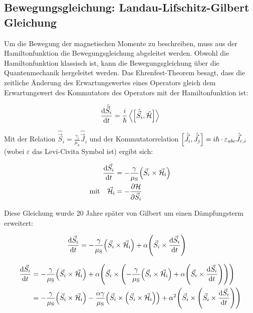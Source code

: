 \documentclass[main.tex]{subfiles}
\begin{document}
\subsection{Bewegungsgleichung: Landau-Lifschitz-Gilbert Gleichung}
Um die Bewegung der magnetischen Momente zu beschreiben, muss aus der
Hamiltonfunktion die Bewegungsgleichung abgeleitet werden.
Obwohl die Hamiltonfunktion klassisch ist, kann die Bewegungsgleichung über die
Quantenmechanik hergeleitet werden. Das Ehrenfest-Theorem besagt, dass die
zeitliche Änderung des Erwartungswertes eines Operators gleich dem
Erwartungswert des Kommutators des Operators mit der Hamiltonfunktion ist:

\begin{align}
	\dv{\hat{\vec{S}}_i}{t} = \frac{i}{\hbar} \expval{\qty[\hat{\vec{S}}_i,
			\hat{\mathcal{H}}]}
\end{align}%

Mit der Relation \(\hat{\vec{S}}_i = \frac{\gamma_i}{\mu_{\text{S}}}
\hat{\vec{J}}_i\) und der Kommutatorrelation \(\qty[\hat{\vec{J}}_i,
	\hat{\vec{J}}_j] = i \hbar \cdot \varepsilon_{abc}
\hat{\vec{J}}_{c,i}\) (wobei
\(\varepsilon\) das Levi-Civita Symbol ist) ergibt sich:

\begin{align}
	\dv{\vec{S}_i}{t}                             & = -\frac{\gamma
	}{\mu_{\text{S}}}
	\qty(\vec{S}_i \times
	\vec{\mathcal{H}}_{\text{i}})
	\\
	\text{mit} \quad \vec{\mathcal{H}}_{\text{i}} & = -
	\pdv{\mathcal{H}}{\vec{S}_i}
\end{align}\cite{landau-lifshitz}

Diese Gleichung wurde 20 Jahre später von Gilbert um einen Dämpfungsterm
erweitert:

\begin{align}
	\dv{\vec{S}_i}{t} & = -\frac{\gamma }{\mu_{\text{S}}}\qty(\vec{S}_i
	\times
	\vec{\mathcal{H}}_{\text{i}}) + \alpha \qty(\vec{S}_i \times
	\dv{\vec{S}_i}{t})
\end{align}\cite{Gilbert-damping}

\begin{align}
	\dv{\vec{S}_i}{t} & = -\frac{\gamma }{\mu_{\text{S}}}\qty(\vec{S}_i
	\times
	\vec{\mathcal{H}}_{\text{i}}) + \alpha \qty(\vec{S}_i \times
	\qty(-\frac{\gamma }{\mu_{\text{S}}}\qty(\vec{S}_i
		\times
		\vec{\mathcal{H}}_{\text{i}}) + \alpha \qty(\vec{S}_i \times
	\dv{\vec{S}_i}{t})))                                                \\
	                  & = -\frac{\gamma }{\mu_{\text{S}}}\qty(\vec{S}_i
	\times
	\vec{\mathcal{H}}_{\text{i}}) - \frac{\alpha\gamma}{\mu_\text{S}}
	\qty(\vec{S}_i \times \qty(\vec{S}_i \times
		\vec{\mathcal{H}}_{\text{i}})) +
	\alpha^2 \qty(\vec{S}_i \times \qty(\vec{S}_i \times
		\dv{\vec{S}_i}{t}))
\end{align}
\end{document}
